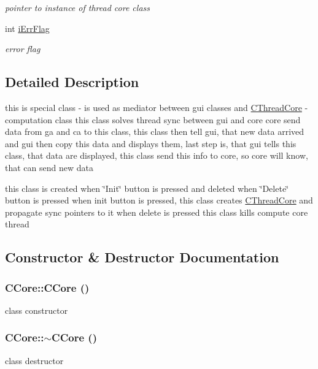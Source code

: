 \begin{DoxyCompactItemize}
\begin{DoxyCompactList}\small\item\em pointer to instance of thread core class \item\end{DoxyCompactList}\item 
\hypertarget{classCCore_a0d7dcc59aa4cde53f4edc7006e45a2c6}{
int \hyperlink{classCCore_a0d7dcc59aa4cde53f4edc7006e45a2c6}{iErrFlag}}
\label{classCCore_a0d7dcc59aa4cde53f4edc7006e45a2c6}

\begin{DoxyCompactList}\small\item\em error flag \item\end{DoxyCompactList}\end{DoxyCompactItemize}


\subsection{Detailed Description}
this is special class -\/ is used as mediator between gui classes and \hyperlink{classCThreadCore}{CThreadCore} -\/ computation class this class solves thread sync between gui and core core send data from ga and ca to this class, this class then tell gui, that new data arrived and gui then copy this data and displays them, last step is, that gui tells this class, that data are displayed, this class send this info to core, so core will know, that can send new data

this class is created when \char`\"{}Init\char`\"{} button is pressed and deleted when \char`\"{}Delete\char`\"{} button is pressed when init button is pressed, this class creates \hyperlink{classCThreadCore}{CThreadCore} and propagate sync pointers to it when delete is pressed this class kills compute core thread 

\subsection{Constructor \& Destructor Documentation}
\hypertarget{classCCore_a4c7b83e9a0113f0d4eb0c1d86e6d6be7}{
\subsubsection[{CCore}]{\setlength{\rightskip}{0pt plus 5cm}CCore::CCore ()}}
\label{classCCore_a4c7b83e9a0113f0d4eb0c1d86e6d6be7}
class constructor \hypertarget{classCCore_ad0d1b93c70b1225137690ecb205d49bd}{
\subsubsection[{$\sim$CCore}]{\setlength{\rightskip}{0pt plus 5cm}CCore::$\sim$CCore ()}}
\label{classCCore_ad0d1b93c70b1225137690ecb205d49bd}
class destructor 

